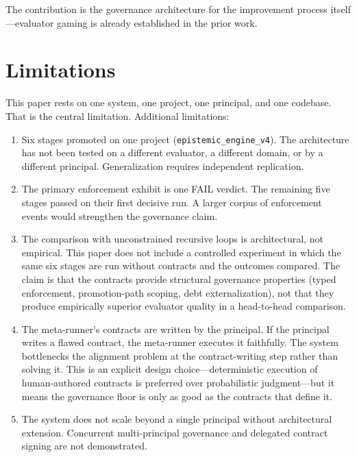 \documentclass[11pt]{article}
\begin{document}
The contribution is the governance architecture for the improvement process itself---evaluator gaming is already established in the prior work.


\section{Limitations}

This paper rests on one system, one project, one principal, and one codebase. That is the central limitation. Additional limitations:

\begin{enumerate}[label=(\alph*),nosep]
\item Six stages promoted on one project (\texttt{epistemic\_engine\_v4}). The architecture has not been tested on a different evaluator, a different domain, or by a different principal. Generalization requires independent replication.

\item The primary enforcement exhibit is one FAIL verdict. The remaining five stages passed on their first decisive run. A larger corpus of enforcement events would strengthen the governance claim.

\item The comparison with unconstrained recursive loops is architectural, not empirical. This paper does not include a controlled experiment in which the same six stages are run without contracts and the outcomes compared. The claim is that the contracts provide structural governance properties (typed enforcement, promotion-path scoping, debt externalization), not that they produce empirically superior evaluator quality in a head-to-head comparison.

\item The meta-runner's contracts are written by the principal. If the principal writes a flawed contract, the meta-runner executes it faithfully. The system bottlenecks the alignment problem at the contract-writing step rather than solving it. This is an explicit design choice---deterministic execution of human-authored contracts is preferred over probabilistic judgment---but it means the governance floor is only as good as the contracts that define it.

\item The system does not scale beyond a single principal without architectural extension. Concurrent multi-principal governance and delegated contract signing are not demonstrated.
\end{enumerate}
\end{document}
